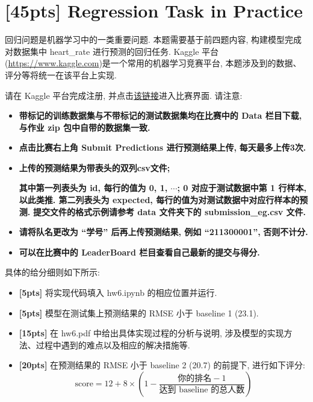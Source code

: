 \documentclass[a4paper,UTF8]{article}
\numberwithin{equation}{section}
\numberwithin{equation}{section}
\theoremstyle{definition}
\begin{document}
\newpage

\section{[45pts] Regression Task in Practice}
回归问题是机器学习中的一类重要问题. 本题需要基于前四题内容, 构建模型完成对数据集中 heart\_rate  进行预测的回归任务. Kaggle 平台(\href{https://www.kaggle.com}{https://www.kaggle.com})是一个常用的机器学习竞赛平台, 本题涉及到的数据、评分等将统一在该平台上实现.

请在 Kaggle 平台完成注册, 并点击\href{https://www.kaggle.com/t/3292cd87cf7f4ec8af0889617d410af8}{该链接}进入比赛界面. 请注意:

\begin{itemize}
    \item \textbf{带标记的训练数据集与不带标记的测试数据集均在比赛中的 Data 栏目下载, 与作业 zip 包中自带的数据集一致.}
    \item \textbf{点击比赛右上角 Submit Predictions 进行预测结果上传, }{\color{red} \textbf{每天最多上传3次.}}
    \item \textbf{上传的预测结果为带表头的双列csv文件; }
    
    {\color{red} \textbf{其中第一列表头为 id, 每行的值为 0, 1, $\cdots$; 0 对应于测试数据中第 1 行样本, 以此类推. 第二列表头为 expected, 每行的值为对测试数据中对应行样本的预测.} } \textbf{提交文件的格式示例请参考 data 文件夹下的 submission\_eg.csv 文件.}
    \item \textbf{请将队名更改为 “学号” 后再上传预测结果, 例如 “211300001”, }{\color{red} \textbf{否则不计分.}} 
    \item \textbf{可以在比赛中的 LeaderBoard 栏目查看自己最新的提交与得分.}
\end{itemize}







具体的给分细则如下所示:
\begin{itemize}
    \item \textbf{[5pts]} 将实现代码填入 hw6.ipynb 的相应位置并运行.
    \item \textbf{[5pts]} 模型在测试集上预测结果的 RMSE 小于 baseline 1 (23.1).
    \item \textbf{[15pts]} 在 hw6.pdf 中给出具体实现过程的分析与说明, 涉及模型的实现方法、过程中遇到的难点以及相应的解决措施等.
    \item \textbf{[20pts]} 在预测结果的 RMSE 小于 baseline 2 (20.7) 的前提下, 进行如下评分:
    \[\text{score} = 12  + 8\times \left(1-\frac{\text{你的排名}-1}{\text{达到 baseline 的总人数}}\right)\]
\end{itemize}
\end{document}
